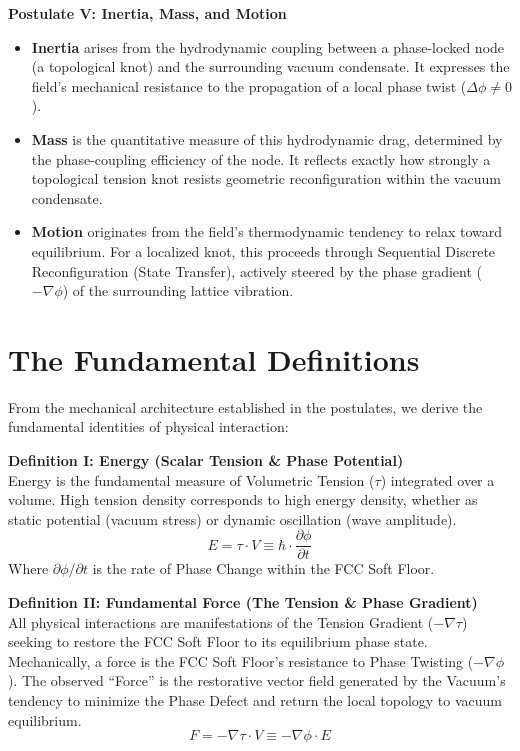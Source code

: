 \vspace{0.5em}
\noindent\textbf{Postulate V: Inertia, Mass, and Motion}
\begin{itemize}
    \item \textbf{Inertia} arises from the hydrodynamic coupling between a phase-locked node (a topological knot) and the surrounding vacuum condensate. It expresses the field's mechanical resistance to the propagation of a local phase twist ($\Delta\phi \neq 0$).
    \item \textbf{Mass} is the quantitative measure of this hydrodynamic drag, determined by the phase-coupling efficiency of the node. It reflects exactly how strongly a topological tension knot resists geometric reconfiguration within the vacuum condensate.
    \item \textbf{Motion} originates from the field's thermodynamic tendency to relax toward equilibrium. For a localized knot, this proceeds through Sequential Discrete Reconfiguration (State Transfer), actively steered by the phase gradient ($-\nabla\phi$) of the surrounding lattice vibration.
\end{itemize}

\section{The Fundamental Definitions}
From the mechanical architecture established in the postulates, we derive the fundamental identities of physical interaction:

\vspace{0.5em}
\noindent\textbf{Definition I: Energy (Scalar Tension \& Phase Potential)}\\
Energy is the fundamental measure of Volumetric Tension ($\tau$) integrated over a volume. High tension density corresponds to high energy density, whether as static potential (vacuum stress) or dynamic oscillation (wave amplitude).
\begin{equation}
    E = \tau \cdot V \equiv \hbar \cdot \frac{\partial\phi}{\partial t}
\end{equation}
Where $\partial\phi/\partial t$ is the rate of Phase Change within the FCC Soft Floor.

\vspace{0.5em}
\noindent\textbf{Definition II: Fundamental Force (The Tension \& Phase Gradient)}\\
All physical interactions are manifestations of the Tension Gradient ($-\nabla\tau$) seeking to restore the FCC Soft Floor to its equilibrium phase state. Mechanically, a force is the FCC Soft Floor's resistance to Phase Twisting ($-\nabla\phi$). The observed ``Force'' is the restorative vector field generated by the Vacuum's tendency to minimize the Phase Defect and return the local topology to vacuum equilibrium.
\begin{equation}
    F = -\nabla\tau \cdot V \equiv -\nabla\phi \cdot E
\end{equation}

